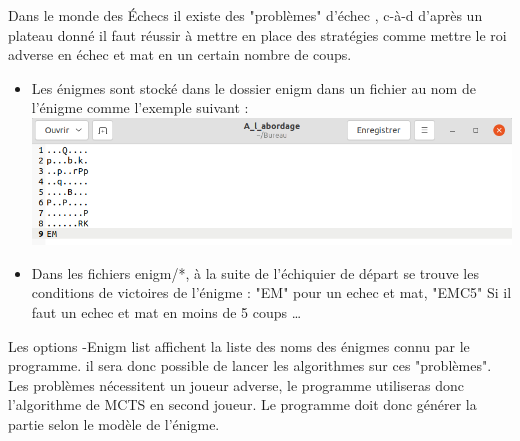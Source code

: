\documentclass{article}
\begin{document}
\begin{itemize}
    \newline
        Dans le monde des Échecs il existe des "problèmes" d'échec \cite{Krt}, c-à-d d'après un plateau donné il faut réussir à mettre en place des stratégies comme mettre le roi adverse en échec et mat en un certain nombre de coups.\newline
        \begin{itemize}
            \item Les énigmes sont stocké dans le dossier enigm dans un fichier au nom de l'énigme comme l'exemple suivant : \newline
            \includegraphics[scale = 0.3]{img/a_l_abordage.png}
            \item Dans les fichiers enigm/*, à la suite de l'échiquier de départ se trouve les conditions de victoires de l'énigme : "EM" pour un echec et mat, "EMC5" Si il faut un echec et mat en moins de 5 coups \dots
        \end{itemize}
        Les options -Enigm list affichent la liste des noms des énigmes connu par le programme.
        il sera donc possible de lancer les algorithmes sur ces "problèmes".
        Les problèmes nécessitent un joueur adverse, le programme utiliseras donc l'algorithme de MCTS en second joueur.
        Le programme doit donc générer la partie selon le modèle de l'énigme.
\end{itemize}
\end{document}
